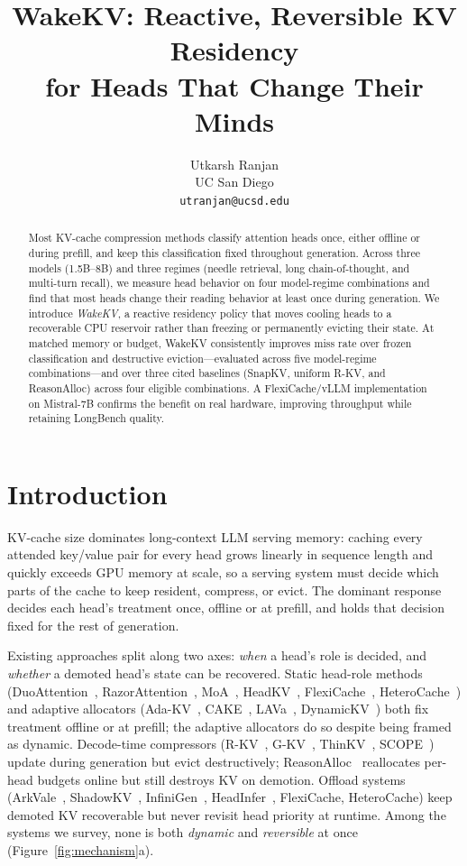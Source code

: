 \documentclass{article}
\title{WakeKV: Reactive, Reversible KV Residency\\
       for Heads That Change Their Minds}
\author{%
  Utkarsh Ranjan \\
  UC San Diego \\
  \texttt{utranjan@ucsd.edu} \\
}
\begin{document}
\maketitle

\begin{abstract}
Most KV-cache compression methods classify attention heads once, either
offline or during prefill, and keep this classification fixed
throughout generation. Across three models (1.5B--8B) and three
regimes (needle retrieval, long chain-of-thought, and multi-turn
recall), we measure head behavior on four model-regime combinations
and find that most heads change their reading behavior at least once
during generation. We introduce \emph{WakeKV}, a reactive
residency policy that moves cooling heads to a recoverable CPU
reservoir rather than freezing or permanently evicting their state. At
matched memory or budget, WakeKV consistently improves miss rate over
frozen classification and destructive eviction---evaluated across five
model-regime combinations---and over three cited baselines (SnapKV,
uniform R-KV, and ReasonAlloc) across four eligible combinations. A
FlexiCache/vLLM implementation on Mistral-7B confirms the benefit on
real hardware, improving throughput while retaining LongBench quality.
\end{abstract}

\section{Introduction}
\label{sec:intro}

KV-cache size dominates long-context LLM serving memory: caching every
attended key/value pair for every head grows linearly in sequence
length and quickly exceeds GPU memory at scale, so a serving system
must decide which parts of the cache to keep resident, compress, or
evict. The dominant response decides each head's treatment once,
offline or at prefill, and holds that decision fixed for the rest of
generation.

Existing approaches split along two axes: \emph{when} a head's role is
decided, and \emph{whether} a demoted head's state can be recovered.
Static head-role methods (DuoAttention~\cite{duoattention},
RazorAttention~\cite{razorattention}, MoA~\cite{moa},
HeadKV~\cite{headkv}, FlexiCache~\cite{flexicache},
HeteroCache~\cite{heterocache}) and adaptive allocators
(Ada-KV~\cite{adakv}, CAKE~\cite{cake}, LAVa~\cite{lava},
DynamicKV~\cite{dynamickv}) both fix treatment offline or at prefill;
the adaptive allocators do so despite being framed as dynamic.
Decode-time compressors (R-KV~\cite{rkv},
G-KV~\cite{gkv}, ThinKV~\cite{thinkv}, SCOPE~\cite{scope}) update during
generation but evict destructively; ReasonAlloc~\cite{reasonalloc}
reallocates per-head budgets online but still destroys KV on demotion.
Offload systems (ArkVale~\cite{arkvale}, ShadowKV~\cite{shadowkv},
InfiniGen~\cite{infinigen}, HeadInfer~\cite{headinfer}, FlexiCache,
HeteroCache) keep demoted KV recoverable but never revisit head
priority at runtime. Among the systems we survey, none is both
\emph{dynamic} and \emph{reversible} at once (Figure~\ref{fig:mechanism}a).
\end{document}
